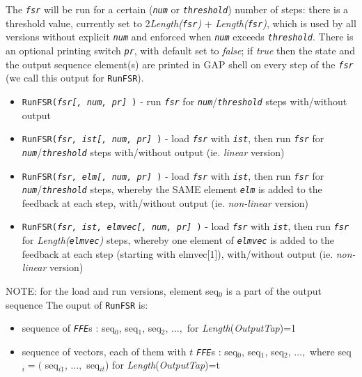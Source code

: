\documentclass[a4paper,11pt]{report}
\begin{document}
{{{ The \mbox{\texttt{\mdseries\slshape fsr}} will be run for a certain (\mbox{\texttt{\mdseries\slshape num}} or \mbox{\texttt{\mdseries\slshape threshold}}) number of steps: there is a threshold value, currently set to
2\texttt{}\emph{Length(\mbox{\texttt{\mdseries\slshape fsr}})} + \emph{Length(\mbox{\texttt{\mdseries\slshape fsr}})}, which is used by all versions without explicit \mbox{\texttt{\mdseries\slshape num}} and enforced when \mbox{\texttt{\mdseries\slshape num}} exceeds \mbox{\texttt{\mdseries\slshape threshold}}. There is an optional printing switch \mbox{\texttt{\mdseries\slshape pr}}, with default set to \emph{false}; if \emph{true} then the state and the output sequence element(s) are printed in \textsf{GAP} shell on every step of the \mbox{\texttt{\mdseries\slshape fsr}} (we call this output for \texttt{RunFSR}). 
\begin{itemize}
\item  \texttt{RunFSR(\mbox{\texttt{\mdseries\slshape  fsr[, num, pr] }})} - run \mbox{\texttt{\mdseries\slshape fsr}} for \mbox{\texttt{\mdseries\slshape num}}/\mbox{\texttt{\mdseries\slshape threshold}} steps with/without output
\item  \texttt{RunFSR(\mbox{\texttt{\mdseries\slshape  fsr, ist[, num, pr] }})} - load \mbox{\texttt{\mdseries\slshape fsr}} with \mbox{\texttt{\mdseries\slshape ist}}, then run \mbox{\texttt{\mdseries\slshape fsr}} for \mbox{\texttt{\mdseries\slshape num}}/\mbox{\texttt{\mdseries\slshape threshold}} steps with/without output (ie. \emph{linear} version)
\item  \texttt{RunFSR(\mbox{\texttt{\mdseries\slshape  fsr, elm[, num, pr] }})} - load \mbox{\texttt{\mdseries\slshape fsr}} with \mbox{\texttt{\mdseries\slshape ist}}, then run \mbox{\texttt{\mdseries\slshape fsr}} for \mbox{\texttt{\mdseries\slshape num}}/\mbox{\texttt{\mdseries\slshape threshold}} steps, whereby the SAME element \mbox{\texttt{\mdseries\slshape elm}} is added to the feedback at each step, with/without output (ie. \emph{non-linear} version)
\item  \texttt{RunFSR(\mbox{\texttt{\mdseries\slshape  fsr, ist, elmvec[, num, pr] }})} - load \mbox{\texttt{\mdseries\slshape fsr}} with \mbox{\texttt{\mdseries\slshape ist}}, then run \mbox{\texttt{\mdseries\slshape fsr}} for \emph{Length(\mbox{\texttt{\mdseries\slshape elmvec}})} steps, whereby one element of \mbox{\texttt{\mdseries\slshape elmvec}} is added to the feedback at each step (starting with elmvec[1]), with/without
output (ie. \emph{non-linear} version)
\end{itemize}
 NOTE: for the load and run versions, element seq$_0$ is a part of the output sequence The ouput of \texttt{RunFSR} is: 
\begin{itemize}
\item  sequence of \mbox{\texttt{\mdseries\slshape FFE}}s : seq$_0$, seq$_1$, seq$_2$, $\dots ,$ for \emph{Length}(\emph{OutputTap})=1
\item  sequence of vectors, each of them with $t$ \mbox{\texttt{\mdseries\slshape FFE}}s : seq$_0$, seq$_1$, seq$_2$, $\dots ,$ where seq$_i=($ seq$_{i1}$, $\dots ,$ seq$_{it}$) for \emph{Length}(\emph{OutputTap})=t
\end{itemize}
 }

}}
\end{document}
